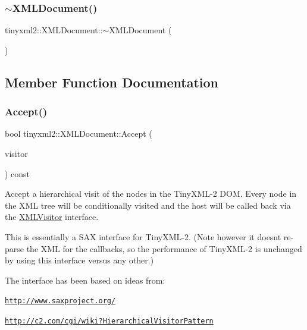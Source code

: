 \subsubsection{\texorpdfstring{$\sim$\+X\+M\+L\+Document()}{~XMLDocument()}}
{\footnotesize\ttfamily tinyxml2\+::\+X\+M\+L\+Document\+::$\sim$\+X\+M\+L\+Document (\begin{DoxyParamCaption}{ }\end{DoxyParamCaption})}



\subsection{Member Function Documentation}
\mbox{\label{classtinyxml2_1_1_x_m_l_document_ab7be651917a35ab1ff0e4e6d4e565cdf}} 
\subsubsection{\texorpdfstring{Accept()}{Accept()}}
{\footnotesize\ttfamily bool tinyxml2\+::\+X\+M\+L\+Document\+::\+Accept (\begin{DoxyParamCaption}\item[{\hyperlink{classtinyxml2_1_1_x_m_l_visitor}{X\+M\+L\+Visitor} $\ast$}]{visitor }\end{DoxyParamCaption}) const\hspace{0.3cm}{\ttfamily [virtual]}}

Accept a hierarchical visit of the nodes in the Tiny\+X\+M\+L-\/2 D\+OM. Every node in the X\+ML tree will be conditionally visited and the host will be called back via the \hyperlink{classtinyxml2_1_1_x_m_l_visitor}{X\+M\+L\+Visitor} interface.

This is essentially a S\+AX interface for Tiny\+X\+M\+L-\/2. (Note however it doesn\textquotesingle{}t re-\/parse the X\+ML for the callbacks, so the performance of Tiny\+X\+M\+L-\/2 is unchanged by using this interface versus any other.)

The interface has been based on ideas from\+:


\begin{DoxyItemize}
\item \href{http://www.saxproject.org/}{\tt http\+://www.\+saxproject.\+org/}
\item \href{http://c2.com/cgi/wiki?HierarchicalVisitorPattern}{\tt http\+://c2.\+com/cgi/wiki?\+Hierarchical\+Visitor\+Pattern}
\end{DoxyItemize}

